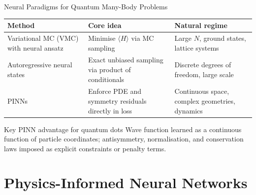 \documentclass[aspectratio=169,10pt]{beamer}
\begin{document}
\begin{frame}{Neural Paradigms for Quantum Many-Body Problems}
  \renewcommand{\arraystretch}{1.35}
  \begin{tabular}{p{2.6cm}p{4.0cm}p{4.6cm}}
    \toprule
    \textbf{Method} & \textbf{Core idea} & \textbf{Natural regime} \\
    \midrule
    Variational MC (VMC) with neural ansatz &
      Minimise $\langle H\rangle$ via MC sampling &
      Large $N$, ground states, lattice systems \\
    Autoregressive neural states &
      Exact unbiased sampling via product of conditionals &
      Discrete degrees of freedom, large scale \\
    \alert{PINNs} &
      Enforce PDE and symmetry residuals directly in loss &
      Continuous space, complex geometries, dynamics \\
    \bottomrule
  \end{tabular}

  \vspace{0.5cm}
  \begin{alertblock}{Key PINN advantage for quantum dots}
    Wave function learned as a continuous function
    of particle coordinates; antisymmetry, normalisation, and conservation
    laws imposed as explicit constraints or penalty terms.
  \end{alertblock}
\end{frame}

\section{Physics-Informed Neural Networks}
\end{document}
